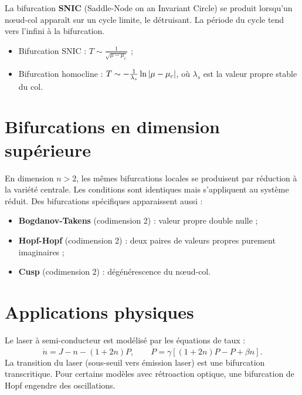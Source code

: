\begin{definition}
La bifurcation \textbf{SNIC} (Saddle-Node on an Invariant Circle) se produit
lorsqu'un n\oe ud-col appara\^it sur un cycle limite, le d\'etruisant.
La p\'eriode du cycle tend vers l'infini \`a la bifurcation.
\end{definition}

\begin{theoreme}
\begin{itemize}
    \item Bifurcation SNIC : $T \sim \frac{1}{\sqrt{\mu - \mu_c}}$ ;
    \item Bifurcation homocline : $T \sim -\frac{1}{\lambda_s}\ln\left| \mu - \mu_c \right|$,
    o\`u $\lambda_s$ est la valeur propre stable du col.
\end{itemize}
\end{theoreme}

\section{Bifurcations en dimension sup\'erieure}

\begin{remarque}
En dimension $n > 2$, les m\^emes bifurcations locales se produisent par
r\'eduction \`a la vari\'et\'e centrale. Les conditions sont identiques mais
s'appliquent au syst\`eme r\'eduit. Des bifurcations sp\'ecifiques
apparaissent aussi :
\begin{itemize}
    \item \textbf{Bogdanov-Takens} (codimension 2) : valeur propre double
    nulle ;
    \item \textbf{Hopf-Hopf} (codimension 2) : deux paires de valeurs
    propres purement imaginaires ;
    \item \textbf{Cusp} (codimension 2) : d\'eg\'en\'erescence du
    n\oe ud-col.
\end{itemize}
\end{remarque}

\section{Applications physiques}

\begin{exemple}[Laser]
Le laser \`a semi-conducteur est mod\'elis\'e par les \'equations de taux :
\[
    \dot{n} = J - n - (1 + 2n)P, \qquad \dot{P} = \gamma\left[(1 + 2n)P - P + \beta n\right].
\]
La transition du laser (sous-seuil vers \'emission laser) est une bifurcation
transcritique. Pour certains mod\`eles avec r\'etroaction optique, une
bifurcation de Hopf engendre des oscillations.
\end{exemple}

